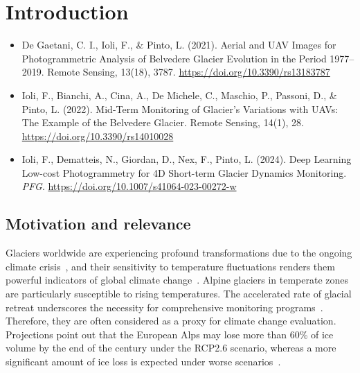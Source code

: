 \graphicspath{{figures/chapter1/}}
\onehalfspacing

\chapter{Introduction}\label{ch:1}

\vfill


\noindent 

\begin{itemize}
    \item De Gaetani, C. I., Ioli, F., \& Pinto, L. (2021). Aerial and UAV Images for Photogrammetric Analysis of Belvedere Glacier Evolution in the Period 1977–2019. Remote Sensing, 13(18), 3787. \url{https://doi.org/10.3390/rs13183787}
    \item Ioli, F., Bianchi, A., Cina, A., De Michele, C., Maschio, P., Passoni, D., \& Pinto, L. (2022). Mid-Term Monitoring of Glacier’s Variations with UAVs: The Example of the Belvedere Glacier. Remote Sensing, 14(1), 28. \url{https://doi.org/10.3390/rs14010028}
    \item Ioli, F., Dematteis, N., Giordan, D., Nex, F., Pinto, L. (2024). Deep Learning Low-cost Photogrammetry for 4D Short-term Glacier Dynamics Monitoring. \textit{PFG}. \url{https://doi.org/10.1007/s41064-023-00272-w}
\end{itemize}

\newpage

\section{Motivation and relevance}

Glaciers worldwide are experiencing profound transformations due to the ongoing climate crisis~\citep{Oerlemans2005}, and their sensitivity to temperature fluctuations renders them powerful indicators of global climate change~\citep{Barry2006}.
Alpine glaciers in temperate zones are particularly susceptible to rising temperatures. The accelerated rate of glacial retreat underscores the necessity for comprehensive monitoring programs~\citep{Zemp2006, Sommer2020}. 
Therefore, they are often considered as a proxy for climate change evaluation.
Projections point out that the European Alps may lose more than 60\% of ice volume by the end of the century under the RCP2.6 scenario, whereas a more significant amount of ice loss is expected under worse scenarios~\citep{Zekollari2019}.

